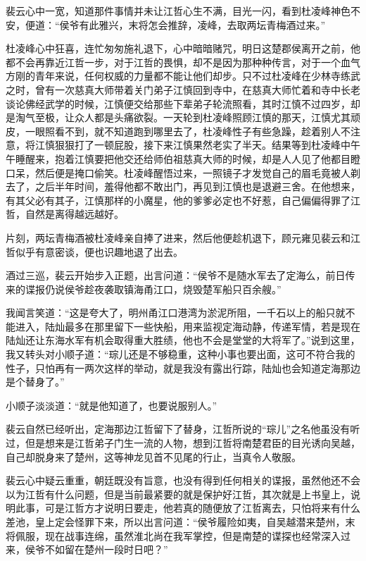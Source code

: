 裴云心中一宽，知道那件事情并未让江哲心生不满，目光一闪，看到杜凌峰神色不安，便道：“侯爷有此雅兴，末将怎会推辞，凌峰，去取两坛青梅酒过来。”

杜凌峰心中狂喜，连忙匆匆施礼退下，心中暗暗赌咒，明日这楚郡侯离开之前，他都不会再靠近江哲一步，对于江哲的畏惧，却不是因为那种种传言，对于一个血气方刚的青年来说，任何权威的力量都不能让他们却步。只不过杜凌峰在少林寺练武之时，曾有一次慈真大师带着关门弟子江慎回到寺中，在慈真大师忙着和寺中长老谈论佛经武学的时候，江慎便交给那些下辈弟子轮流照看，其时江慎不过四岁，却是淘气至极，让众人都是头痛欲裂。一天轮到杜凌峰照顾江慎的那天，江慎尤其顽皮，一眼照看不到，就不知道跑到哪里去了，杜凌峰性子有些急躁，趁着别人不注意，将江慎狠狠打了一顿屁股，接下来江慎果然老实了半天。结果等到杜凌峰中午午睡醒来，抱着江慎要把他交还给师伯祖慈真大师的时候，却是人人见了他都目瞪口呆，然后便是掩口偷笑。杜凌峰醒悟过来，一照镜子才发觉自己的眉毛竟被人剃去了，之后半年时间，羞得他都不敢出门，再见到江慎也是退避三舍。在他想来，有其父必有其子，江慎那样的小魔星，他的爹爹必定也不好惹，自己偏偏得罪了江哲，自然是离得越远越好。

片刻，两坛青梅酒被杜凌峰亲自捧了进来，然后他便趁机退下，顾元雍见裴云和江哲似乎有意密谈，便也识趣地退了出去。

酒过三巡，裴云开始步入正题，出言问道：“侯爷不是随水军去了定海么，前日传来的谍报仍说侯爷趁夜袭取镇海甬江口，烧毁楚军船只百余艘。”

我闻言笑道：“这是夸大了，明州甬江口港湾为淤泥所阻，一千石以上的船只就不能进入，陆灿最多在那里留下一些快船，用来监视定海动静，传递军情，若是现在陆灿还让东海水军有机会取得重大胜绩，他也不会是堂堂的大将军了。”说到这里，我又转头对小顺子道：“琮儿还是不够稳重，这种小事也要出面，这可不符合我的性子，只怕再有一两次这样的举动，就是我没有露出行踪，陆灿也会知道定海那边是个替身了。”

小顺子淡淡道：“就是他知道了，也要说服别人。”

裴云自然已经听出，定海那边江哲留下了替身，江哲所说的“琮儿”之名他虽没有听过，但是想来是江哲弟子门生一流的人物，想到江哲将南楚君臣的目光诱向吴越，自己却脱身来了楚州，这等神龙见首不见尾的行止，当真令人敬服。

裴云心中疑云重重，朝廷既没有旨意，也没有得到任何相关的谍报，虽然他还不会以为江哲有什么问题，但是当前最紧要的就是保护好江哲，其次就是上书皇上，说明此事，可是江哲方才说明日要走，他若真的随便放了江哲离去，只怕将来有什么差池，皇上定会怪罪下来，所以出言问道：“侯爷履险如夷，自吴越潜来楚州，末将佩服，现在战事连绵，虽然淮北尚在我军掌控，但是南楚的谍探也经常深入过来，侯爷不如留在楚州一段时日吧？”

